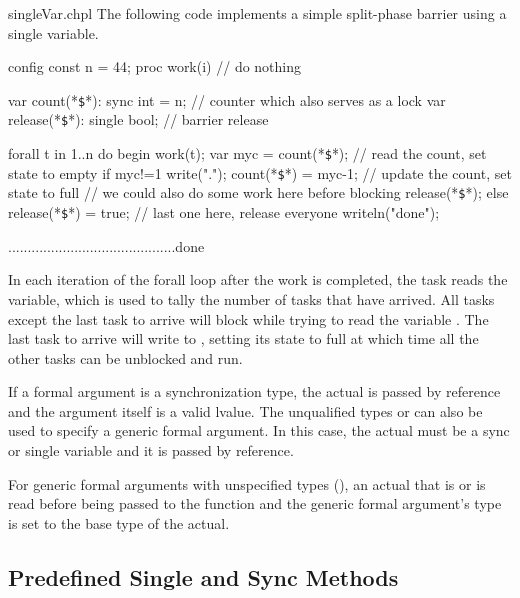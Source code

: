 \begin{chapelexample}{singleVar.chpl}
The following code implements a simple split-phase barrier using a
single variable.
\begin{chapelpre}
config const n = 44;
proc work(i) {
  // do nothing
}
\end{chapelpre}
\begin{chapel}
var count(*\texttt{\$}*): sync int = n;  // counter which also serves as a lock
var release(*\texttt{\$}*): single bool; // barrier release

forall t in 1..n do begin {
  work(t);
  var myc = count(*\texttt{\$}*);  // read the count, set state to empty
  if myc!=1 {
    write(".");
    count(*\texttt{\$}*) = myc-1;  // update the count, set state to full
    // we could also do some work here before blocking
    release(*\texttt{\$}*);
  } else {
    release(*\texttt{\$}*) = true;  // last one here, release everyone
    writeln("done");
  }
}
\end{chapel}
\begin{chapeloutput}
...........................................done
\end{chapeloutput}
In each iteration of the forall loop after the work is completed, the
task reads the  variable, which is
used to tally the number of tasks that have arrived.  All tasks except
the last task to arrive will block while trying to read the
variable .  The last task to arrive
will write to , setting its state to
full at which time all the other tasks can be unblocked and run.
\end{chapelexample}

If a formal argument is a synchronization type, the actual is passed
by reference and the argument itself is a valid lvalue.  The
unqualified types  or  can also be used to
specify a generic formal argument.  In this case, the actual must be a
sync or single variable and it is passed by reference.

For generic formal arguments with unspecified types
(), an actual that
is  or  is read before being passed to the
function and the generic formal argument's type is set to the base
type of the actual.


\subsection{Predefined Single and Sync Methods}
\label{Functions_on_Synchronization_Variables}

